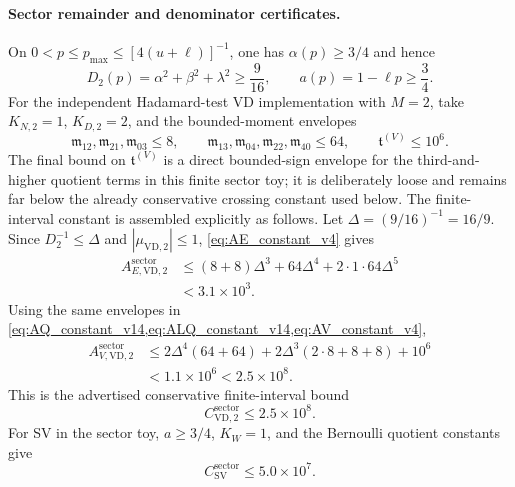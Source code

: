 \documentclass[11pt]{article}
\newcommand{\1}{\mathbf{1}}
\begin{document}
\paragraph{Sector remainder and denominator certificates.}
On \(0<p\le p_{\max}\le[4(u+\ell)]^{-1}\), one has \(\alpha(p)\ge3/4\) and hence
\begin{equation}
    D_2(p)=\alpha^2+\beta^2+\lambda^2\ge \frac{9}{16},
    \qquad
    a(p)=1-\ell p\ge\frac34.
    \label{eq:sector_D_a_lower_v6}
\end{equation}
For the independent Hadamard-test VD implementation with \(M=2\), take \(K_{N,2}=1\), \(K_{D,2}=2\), and the bounded-moment envelopes
\begin{equation}
    \mathfrak m_{12},\mathfrak m_{21},\mathfrak m_{03}\le 8,
    \qquad
    \mathfrak m_{13},\mathfrak m_{04},\mathfrak m_{22},\mathfrak m_{40}\le 64,
    \qquad
    \mathfrak t^{(V)}\le 10^6.
\end{equation}
The final bound on \(\mathfrak t^{(V)}\) is a direct bounded-sign envelope for the third-and-higher quotient terms in this finite sector toy; it is deliberately loose and remains far below the already conservative crossing constant used below.
The finite-interval constant is assembled explicitly as follows.  Let
\(\Delta=(9/16)^{-1}=16/9\).  Since \(D_2^{-1}\le\Delta\) and
\(|\mu_{\mathrm{VD},2}|\le1\), \cref{eq:AE_constant_v4} gives
\begin{align}
    A_{E,\mathrm{VD},2}^{\mathrm{sector}}
    &\le (8+8)\Delta^3+64\Delta^4+2\cdot1\cdot64\Delta^5 \\
    &<3.1\times10^3.
    \label{eq:sector_AE_arithmetic_v7}
\end{align}
Using the same envelopes in \cref{eq:AQ_constant_v14,eq:ALQ_constant_v14,eq:AV_constant_v4},
\begin{align}
    A_{V,\mathrm{VD},2}^{\mathrm{sector}}
    &\le 2\Delta^4(64+64)
      +2\Delta^3(2\cdot8+8+8)+10^6\\
    &<1.1\times10^6<2.5\times10^8.
    \label{eq:sector_AV_arithmetic_v7}
\end{align}
This is the advertised conservative finite-interval bound
\begin{equation}
    C_{\mathrm{VD},2}^{\mathrm{sector}}\le 2.5\times10^8.
    \label{eq:Cvd_sector_v6}
\end{equation}
For SV in the sector toy, \(a\ge3/4\), \(K_W=1\), and the Bernoulli quotient constants give
\begin{equation}
    C_{\mathrm{SV}}^{\mathrm{sector}}\le 5.0\times10^7.
    \label{eq:Csv_sector_v6}
\end{equation}
\end{document}
